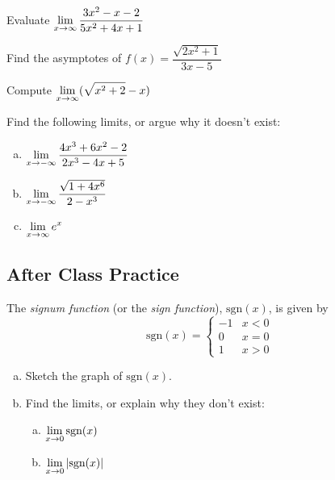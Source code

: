 \documentclass[notes]{subfiles}
\begin{document}
		\begin{ex}
			Evaluate \(\displaystyle \lim_{x\to \infty} \dfrac{3x^2-x-2}{5x^2+4x+1}\)
		\end{ex}
			\newpage
			
		\begin{ex}
			Find the asymptotes of \(f(x) = \dfrac{\sqrt{2x^2+1}}{3x-5}\)
		\end{ex}
			
		\begin{ex}
			Compute \(\displaystyle \lim_{x\to \infty} (\sqrt{x^2+2}-x)\)
		\end{ex}
			\newpage
		\begin{ex}
			Find the following limits, or argue why it doesn't exist:
			\begin{enumerate}[(a)]
				\item \(\displaystyle \lim_{x\to -\infty} \dfrac{4x^3 + 6x^2 - 2}{2x^3 - 4x + 5}\)
					
				\item \(\displaystyle \lim_{x\to -\infty} \dfrac{\sqrt{1+4x^6}}{2-x^3}\)
					
				\item \(\displaystyle \lim_{x\to \infty} e^x\)
					
			\end{enumerate}
		\end{ex}		
			\newpage
			
	\subsection*{After Class Practice}
		\begin{ex}
			The \emph{signum function} (or the \emph{sign function}), \(\text{sgn}(x)\), is given by \[\text{sgn}(x) = \begin{cases}-1 & x < 0\\ 0 & x = 0\\ 1 & x > 0 \end{cases}\]  
			\begin{enumerate}[(a)]
				\item Sketch the graph of \(\text{sgn}(x)\).
					\vs{1}
					
				\item Find the limits, or explain why they don't exist:
					\begin{enumerate}[(a)]
						\item \(\displaystyle \lim_{x\to 0} \text{sgn}(x)\)
							\vs{.5}
						\item \(\displaystyle \lim_{x\to 0} |\text{sgn}(x)|\)
							\vs{.5}
					\end{enumerate}
			\end{enumerate}
		\end{ex}
		
\end{document}
